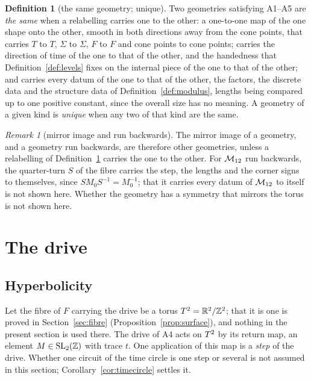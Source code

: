 \documentclass[11pt,a4paper]{article}
\theoremstyle{plain}
\theoremstyle{definition}
\newtheorem{definition}[theorem]{Definition}
\theoremstyle{remark}
\newtheorem{remark}[theorem]{Remark}
\begin{document}
\begin{definition}[the same geometry; unique]\label{def:same}
Two geometries satisfying A1--A5 are \emph{the same} when a relabelling carries one to the other: a one-to-one map of the one shape onto the other, smooth in both directions away from the cone points, that carries $T$ to $T$, $\Sigma$ to $\Sigma$, $F$ to $F$ and cone points to cone points; carries the direction of time of the one to that of the other, and the handedness that Definition~\ref{def:levels} fixes on the internal piece of the one to that of the other; and carries every datum of the one to that of the other, the factors, the discrete data and the structure data of Definition~\ref{def:modulus}, lengths being compared up to one positive constant, since the overall size has no meaning. A geometry of a given kind is \emph{unique} when any two of that kind are the same.
\end{definition}

\begin{remark}[mirror image and run backwards]\label{rem:mirror}
The mirror image of a geometry, and a geometry run backwards, are therefore other geometries, unless a relabelling of Definition~\ref{def:same} carries the one to the other. For $\mathcal{M}_{12}$ run backwards, the quarter-turn $S$ of the fibre carries the step, the lengths and the corner signs to themselves, since $SM_{0}S^{-1}=M_{0}^{-1}$; that it carries every datum of $\mathcal{M}_{12}$ to itself is not shown here. Whether the geometry has a symmetry that mirrors the torus is not shown here.
\end{remark}

\section{The drive}\label{sec:drive}

\subsection{Hyperbolicity}

Let the fibre of $F$ carrying the drive be a torus $T^2=\mathbb{R}^{2}/\mathbb{Z}^{2}$; that it is one is proved in Section~\ref{sec:fibre} (Proposition~\ref{prop:surface}), and nothing in the present section is used there. The drive of A4 acts on $T^2$ by its return map, an element $M\in\mathrm{SL}_{2}(\mathbb{Z})$ with trace $t$. One application of this map is a \emph{step} of the drive. Whether one circuit of the time circle is one step or several is not assumed in this section; Corollary~\ref{cor:timecircle} settles it.
\end{document}
